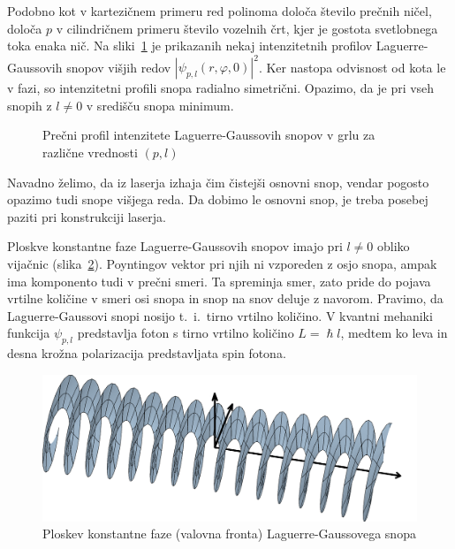 Podobno kot v kartezičnem primeru red polinoma določa število prečnih ničel,
določa $p$ v cilindričnem primeru število vozelnih črt, kjer je gostota 
svetlobnega toka enaka nič. Na sliki~\ref{fig:Laguerrovi_presek}
je prikazanih nekaj intenzitetnih profilov Laguerre-Gaussovih snopov
višjih redov $|\psi_{p,l}(r, \varphi, 0)|^2$. Ker nastopa  odvisnost od kota
le v fazi, so intenzitetni profili snopa radialno simetrični. Opazimo, da je pri  
vseh snopih z $l \ne 0$ v središču snopa minimum. 
\begin{figure}[h]
\centering
\def\svgwidth{110truemm} 

\caption{Prečni profil intenzitete Laguerre-Gaussovih snopov v grlu 
za različne vrednosti $(p,l)$}
\label{fig:Laguerrovi_presek}
\end{figure}

Navadno želimo, da iz laserja izhaja čim čistejši osnovni snop, vendar
pogosto opazimo tudi snope višjega reda. Da dobimo le osnovni
snop, je treba posebej paziti pri konstrukciji laserja.

\begin{remark}
Ploskve konstantne faze Laguerre-Gaussovih snopov imajo pri $l\ne0$  obliko 
vijačnic (slika~\ref{fig:Laguerrova_fronta}). 
Poyntingov vektor 
pri njih ni vzporeden z osjo snopa, ampak ima komponento tudi v prečni smeri. Ta spreminja smer, 
zato pride do pojava vrtilne količine v smeri osi snopa in snop na snov deluje z navorom. 
Pravimo, da Laguerre-Gaussovi snopi nosijo t.\ i.\ tirno vrtilno količino. 
V kvantni mehaniki funkcija $\psi_{p,l}$ predstavlja foton s tirno vrtilno količino $L = \hslash l$, 
medtem ko leva in desna krožna polarizacija predstavljata spin fotona. 
\begin{figure}[h]
\centering
\includegraphics[width=10truecm]{slike/03_Laguerre_faza.png}
\caption{Ploskev konstantne faze (valovna fronta) Laguerre-Gaussovega snopa}
\label{fig:Laguerrova_fronta}
\end{figure}
\end{remark}

